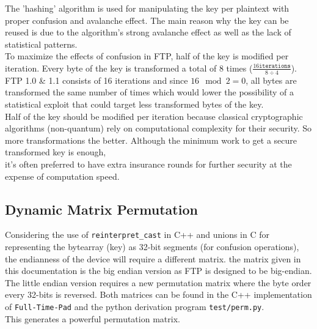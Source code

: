 \documentclass[11pt]{article}
\theoremstyle{definition}
\theoremstyle{remark}
\begin{document}
The 'hashing' algorithm is used for manipulating the key per plaintext with proper confusion and avalanche effect. The main reason why the key can be reused is due to the algorithm's strong avalanche effect as well as the lack of statistical patterns.
\\
To maximize the effects of confusion in FTP, half of the key is modified per iteration. Every byte of the key is transformed a total of 8 times ($\frac{16 \texttt{iterations}}{8 \div 4}$). FTP 1.0 \& 1.1 consists of 16 iterations and since $16 \mod 2 = 0$, all bytes are transformed the same number of times which would lower the possibility of a statistical exploit that could target less transformed bytes of the key.
\\
Half of the key should be modified per iteration because classical cryptographic algorithms (non-quantum) rely on computational complexity for their security. So more transformations the better. Although the minimum work to get a secure transformed key is enough, \\
it's often preferred to have extra insurance rounds for further security at the expense of computation speed.
\\


\subsection{Dynamic Matrix Permutation}

Considering the use of \texttt{reinterpret\_cast} in C++ and unions in C for representing the bytearray (key) as 32-bit segments (for confusion operations), the endianness of the device will require a different matrix. the matrix given in this documentation is the big endian version as FTP is designed to be big-endian. The little endian version requires a new permutation matrix where the byte order every 32-bits is reversed. Both matrices can be found in the C++ implementation of \texttt{Full-Time-Pad} and the python derivation program \texttt{test/perm.py}.
\\
This generates a powerful permutation matrix.
\end{document}
